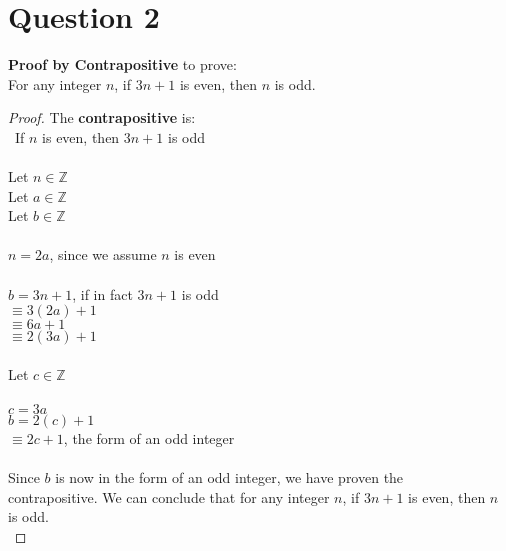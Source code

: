 \documentclass{article}
\begin{document}
    \section*{Question 2}
   \textbf{Proof by Contrapositive} to prove: \\
   \indent For any integer $n$, if $3n + 1$ is even, then $n$ is odd. 
   \begin{proof} The \textbf{contrapositive} is: \\
   \indent \indent \ If $n$ is even, then $3n + 1$ is odd \\ \\
   Let $n \in \mathbb{Z}$ \\
   Let $a \in \mathbb{Z}$ \\ 
   Let $b \in \mathbb{Z}$ \\ \\
   $n = 2a$, since we assume $n$ is even \\ \\
   $b = 3n + 1$, if in fact $3n + 1$ is odd \\
   $\equiv 3(2a) + 1$ \\
   $\equiv 6a + 1$ \\
   $\equiv 2(3a) + 1$ \\ \\
   Let $c \in \mathbb{Z}$ \\ \\
   $c = 3a$ \\
   $b = 2(c) + 1$ \\
   $\equiv 2c + 1$, the form of an odd integer \\ \\
   Since $b$ is now in the form of an odd integer, we have proven the \\ contrapositive. We can conclude that for any integer $n$, if $3n + 1$ is even, then $n$ is odd. \\ \end{proof}
   
   
    \indent
    \newpage
\end{document}
